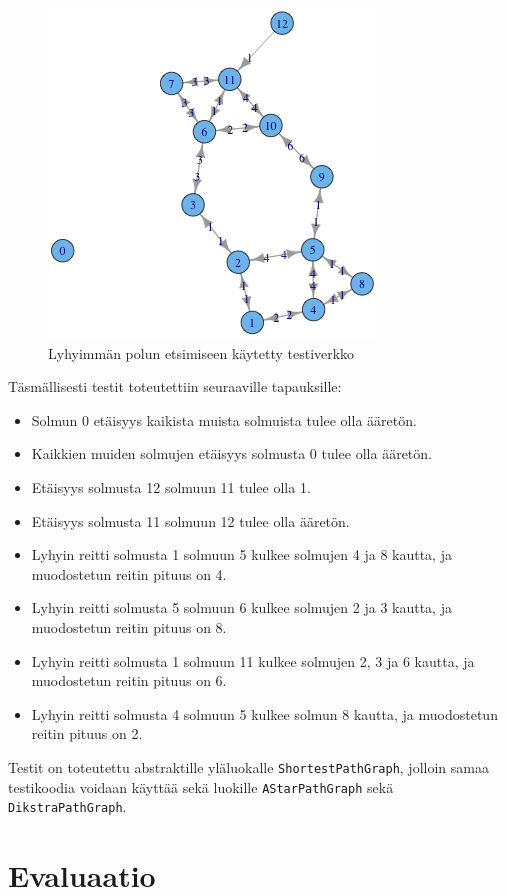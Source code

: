 \documentclass[10pt,a4paper]{article}
\begin{document}
\begin{figure}
\includegraphics[scale=.5]{test_network.png} 
\caption{Lyhyimmän polun etsimiseen käytetty testiverkko}
\label{testiverkko}
\end{figure}

Täsmällisesti testit toteutettiin seuraaville tapauksille:

\begin{itemize}
\item Solmun 0 etäisyys kaikista muista solmuista tulee olla ääretön.
\item Kaikkien muiden solmujen etäisyys solmusta 0 tulee olla ääretön.
\item Etäisyys solmusta 12 solmuun 11 tulee olla 1.
\item Etäisyys solmusta 11 solmuun 12 tulee olla ääretön.
\item Lyhyin reitti solmusta 1 solmuun 5 kulkee solmujen 4 ja 8 kautta, ja muodostetun reitin pituus on 4.
\item Lyhyin reitti solmusta 5 solmuun 6 kulkee solmujen 2 ja 3 kautta, ja muodostetun reitin pituus on 8.
\item Lyhyin reitti solmusta 1 solmuun 11 kulkee solmujen 2, 3 ja 6 kautta, ja muodostetun reitin pituus on 6.
\item Lyhyin reitti solmusta 4 solmuun 5 kulkee solmun 8 kautta, ja muodostetun reitin pituus on 2.
\end{itemize}

Testit on toteutettu abstraktille yläluokalle \texttt{ShortestPathGraph}, jolloin samaa testikoodia voidaan käyttää sekä luokille \texttt{AStarPathGraph} sekä \texttt{DikstraPathGraph}.

\section{Evaluaatio}

 

\end{document}
